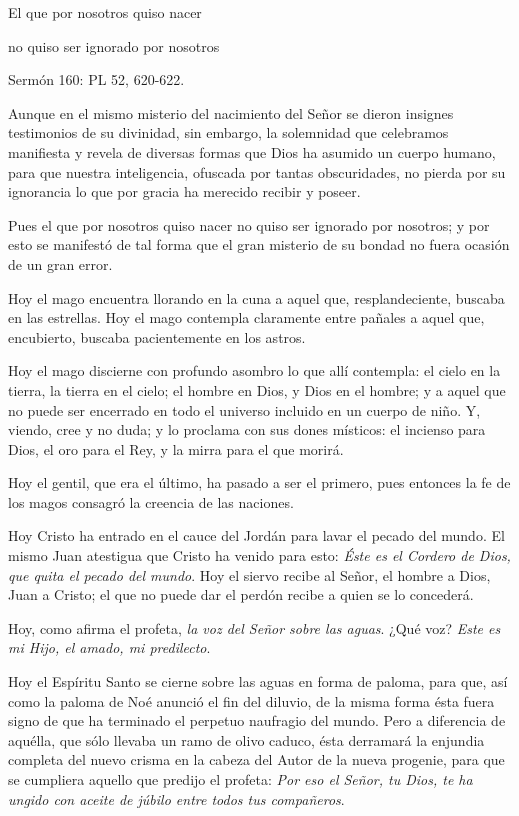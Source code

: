 {El que por nosotros quiso nacer

no quiso ser ignorado por nosotros

Sermón 160: PL 52, 620-622.

Aunque en el mismo misterio del nacimiento del Señor se dieron insignes testimonios de su divinidad, sin embargo, la solemnidad que celebramos manifiesta y revela de diversas formas que Dios ha asumido un cuerpo humano, para que nuestra inteligencia, ofuscada por tantas obscuridades, no pierda por su ignorancia lo que por gracia ha merecido recibir y poseer.

Pues el que por nosotros quiso nacer no quiso ser ignorado por nosotros; y por esto se manifestó de tal forma que el gran misterio de su bondad no fuera ocasión de un gran error.

Hoy el mago encuentra llorando en la cuna a aquel que, resplandeciente, buscaba en las estrellas. Hoy el mago contempla claramente entre pañales a aquel que, encubierto, buscaba pacientemente en los astros.

Hoy el mago discierne con profundo asombro lo que allí contempla: el cielo en la tierra, la tierra en el cielo; el hombre en Dios, y Dios en el hombre; y a aquel que no puede ser encerrado en todo el universo incluido en un cuerpo de niño. Y, viendo, cree y no duda; y lo proclama con sus dones místicos: el incienso para Dios, el oro para el Rey, y la mirra para el que morirá.

Hoy el gentil, que era el último, ha pasado a ser el primero, pues entonces la fe de los magos consagró la creencia de las naciones.

Hoy Cristo ha entrado en el cauce del Jordán para lavar el pecado del mundo. El mismo Juan atestigua que Cristo ha venido para esto: \emph{Éste es el Cordero de Dios, que quita el pecado del mundo}. Hoy el siervo recibe al Señor, el hombre a Dios, Juan a Cristo; el que no puede dar el perdón recibe a quien se lo concederá.

Hoy, como afirma el profeta, \emph{la voz del Señor sobre las aguas}. ¿Qué voz? \emph{Este es mi Hijo, el amado, mi predilecto}.

Hoy el Espíritu Santo se cierne sobre las aguas en forma de paloma, para que, así como la paloma de Noé anunció el fin del diluvio, de la misma forma ésta fuera signo de que ha terminado el perpetuo naufragio del mundo. Pero a diferencia de aquélla, que sólo llevaba un ramo de olivo caduco, ésta derramará la enjundia completa del nuevo crisma en la cabeza del Autor de la nueva progenie, para que se cumpliera aquello que predijo el profeta: \emph{Por eso el Señor, tu Dios, te ha ungido con aceite de júbilo entre todos tus compañeros}.

}
